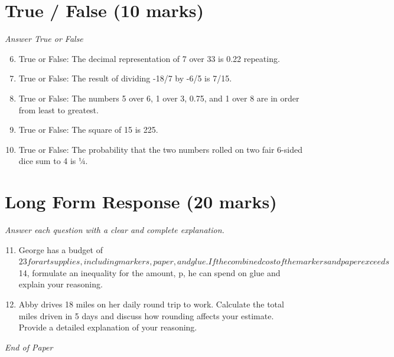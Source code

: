 \documentclass[12pt]{article}
\begin{document}
\section*{True / False (10 marks)}
\textit{Answer True or False}
\begin{enumerate}[label=\arabic*.]
\setcounter{enumi}{5}
\item True or False: The decimal representation of 7 over 33 is 0.22 repeating.
\item True or False: The result of dividing -18/7 by -6/5 is 7/15.
\item True or False: The numbers 5 over 6, 1 over 3, 0.75, and 1 over 8 are in order from least to greatest.
\item True or False: The square of 15 is 225.
\item True or False: The probability that the two numbers rolled on two fair 6-sided dice sum to 4 is ¼.
\end{enumerate}

\section*{Long Form Response (20 marks)}
\textit{Answer each question with a clear and complete explanation.}
\begin{enumerate}[label=\arabic*.]
\setcounter{enumi}{10}
\item George has a budget of $23 for art supplies, including markers, paper, and glue. If the combined cost of the markers and paper exceeds $14, formulate an inequality for the amount, p, he can spend on glue and explain your reasoning.
\item Abby drives 18 miles on her daily round trip to work. Calculate the total miles driven in 5 days and discuss how rounding affects your estimate. Provide a detailed explanation of your reasoning.
\end{enumerate}

\vfill
\noindent\textit{End of Paper}
\end{document}
